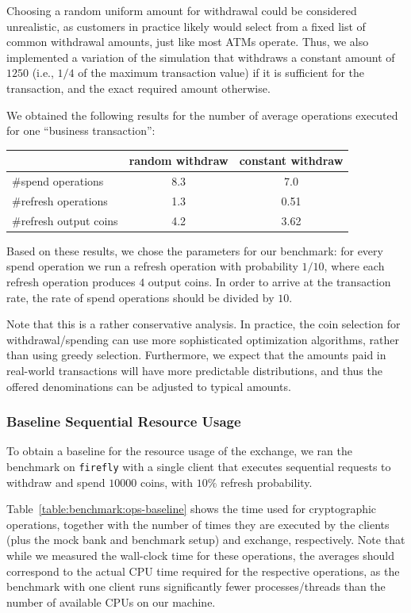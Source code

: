 Choosing a random uniform amount for withdrawal could be considered
unrealistic, as customers in practice likely would select from a fixed list of
common withdrawal amounts, just like most ATMs operate.
Thus, we also implemented a variation of the simulation that withdraws a constant
amount of $1250$ (i.e., $1/4$ of the maximum transaction value) if it is sufficient
for the transaction, and the exact required amount otherwise.

We obtained the following results for the number of average operations
executed for one ``business transaction'':

\begin{table}[H]
\centering
\begin{tabular}{lSS}
  \toprule
  & {random withdraw} & {constant withdraw} \\
  \midrule
  \#spend operations & 8.3 & 7.0 \\
  \#refresh operations & 1.3 & 0.51 \\
  \#refresh output coins & 4.2 & 3.62 \\
  \bottomrule
\end{tabular}
\end{table}

Based on these results, we chose the parameters for our benchmark: for every
spend operation we run a refresh operation with probability $1/10$, where each
refresh operation produces $4$ output coins.  In order to arrive at the
transaction rate, the rate of spend operations should be divided by $10$.

Note that this is a rather conservative analysis.  In practice, the coin
selection for withdrawal/spending can use more sophisticated optimization
algorithms, rather than using greedy selection.  Furthermore, we expect that the
amounts paid in real-world transactions will have more predictable
distributions, and thus the offered denominations can be adjusted to typical
amounts.

\subsubsection{Baseline Sequential Resource Usage}
To obtain a baseline for the resource usage of the exchange, we ran the benchmark on
\texttt{firefly} with a single client that executes sequential requests to
withdraw and spend $10000$ coins, with $10\%$ refresh probability.


Table~\ref{table:benchmark:ops-baseline} shows the time used for cryptographic
operations, together with the number of times they are executed by the clients
(plus the mock bank and benchmark setup) and exchange, respectively.  Note that
while we measured the wall-clock time for these operations, the averages should
correspond to the actual CPU time required for the respective operations, as
the benchmark with one client runs significantly fewer processes/threads than
the number of available CPUs on our machine.

